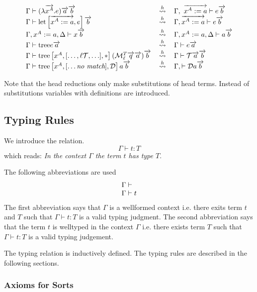 $$
\vertlist{
    \Gamma \vdash (\lambda \vec{ x^A}. e) \vec a \vec b
    &\hreduce&
    \Gamma, \vec{x^A := a} \vdash e \vec b
    \\
    \Gamma \vdash \llet\brackets{\vec {x^A := a}, e} \vec b
    &\hreduce&
    \Gamma, \vec{x^A:=a} \vdash e \vec b
    \\
    \Gamma, x^A:=a, \Delta \vdash x \vec b
    &\hreduce&
    \Gamma, x^A:=a, \Delta \vdash a \vec b
    \\
    \Gamma \vdash \ctree e \vec a
    &\hreduce&
    \Gamma \vdash e \vec a
    \\
    \Gamma \vdash
        \ctree\brackets{x^A, [\ldots, \ell \ct T, \ldots], *}
            (\Make^T_\ell \vec q \vec a) \vec b
    &\hreduce&
    \Gamma \vdash
        \ct T \vec a \vec b
    \\
    \Gamma \vdash
        \ctree\brackets{x^A, [\ldots \text{\it no match}], \ct D}
            a \vec b
    &\hreduce&
    \Gamma, \vdash
        \ct D a \vec b
}
$$

Note that the head reductions only make substitutions of head terms. Instead of
substitutions variables with definitions are introduced.






\subsection{Typing Rules}

We introduce the relation.
$$
\Gamma \vdash t: T
$$
which reads: \emph{In the context $\Gamma$ the term $t$ has type $T$}.

The following abbreviations are used
$$
\begin{array}{lllll} 
    \Gamma \vdash
    \\
    \Gamma \vdash t
 \end{array}
$$
The first abbreviation says that $\Gamma$ is a wellformed context i.e. there
exits term $t$ and $T$ such that $\Gamma \vdash t : T$ is a valid typing
judgment.
%
The second abbreviation says that the term $t$ is welltyped in the context
$\Gamma$ i.e. there exists term $T$ such that $\Gamma \vdash t: T$ is a valid
typing judgement.


The typing relation is inductively defined. The typing rules are described in
the following sections.





\subsubsection{Axioms for Sorts}


